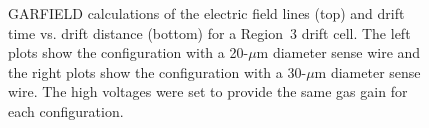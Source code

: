 \begin{figure}[ht]
\vspace{12.0cm}
\caption{\small{GARFIELD calculations of the electric field lines (top)
and drift time vs. drift distance (bottom) for a Region~3 drift cell.  The 
left plots show the configuration with a 20-$\mu$m diameter sense wire and 
the right plots show the configuration with a 30-$\mu$m diameter sense wire.
The high voltages were set to provide the same gas gain for each
configuration.}}
\label{garfield}
\end{figure}
 
